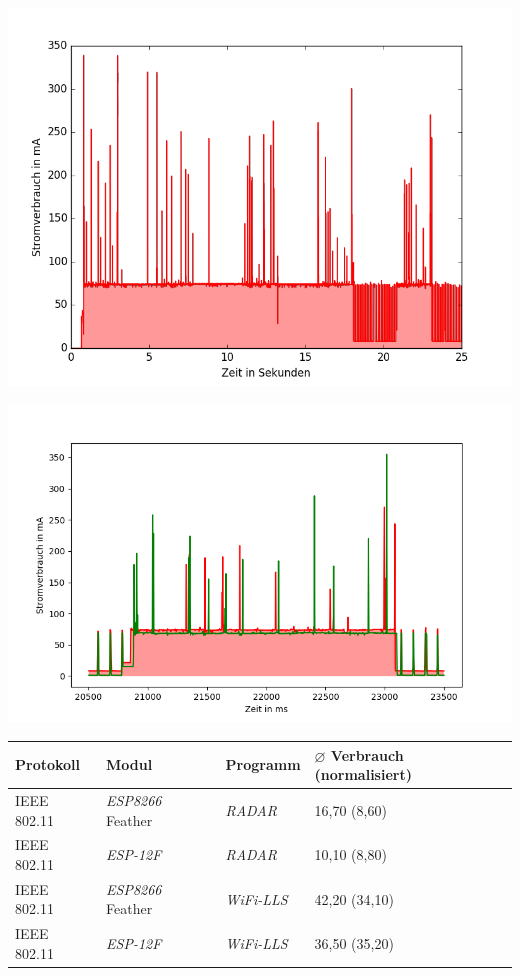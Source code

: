 \documentclass[18pt]{beamer}
\begin{document}
\begin{frame}
	\begin{minipage}[c][\textheight][c]{\textwidth}
		\centering
		\includegraphics[height=0.95\textheight]{plots/wifills.png}
	\end{minipage}
\end{frame}

\begin{frame}
	\begin{minipage}[c][\textheight][c]{\textwidth}
		\centering
		\includegraphics[height=0.95\textheight]{plots/wifillssendv.png}
	\end{minipage}
\end{frame}


\begin{frame}
	\begin{tabular}{l|l|l|R{2.5cm}}
		Protokoll & Modul & Programm  & $\varnothing$ Verbrauch (normalisiert)\\
		\hline
		IEEE 802.11 & \emph{ESP8266} Feather & \emph{RADAR} & 16,70 (8,60)\\
		IEEE 802.11 & \emph{ESP-12F} & \emph{RADAR} & 10,10 (8,80) \\
		\hline
		IEEE 802.11 & \emph{ESP8266} Feather & \emph{WiFi-LLS} & 42,20 (34,10)\\
		IEEE 802.11 & \emph{ESP-12F} & \emph{WiFi-LLS} & 36,50 (35,20)\\
	\end{tabular}
\end{frame}
\end{document}
